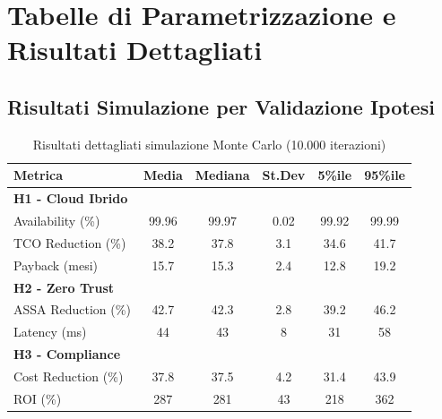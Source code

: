 \chapter{Tabelle di Parametrizzazione e Risultati Dettagliati}

\section{Risultati Simulazione per Validazione Ipotesi}

\begin{table}[H]
\centering
\begin{tabular}{lccccc}
\toprule
\textbf{Metrica} & \textbf{Media} & \textbf{Mediana} & \textbf{St.Dev} & \textbf{5\%ile} & \textbf{95\%ile} \\
\midrule
\multicolumn{6}{l}{\textbf{H1 - Cloud Ibrido}} \\
Availability (\%) & 99.96 & 99.97 & 0.02 & 99.92 & 99.99 \\
TCO Reduction (\%) & 38.2 & 37.8 & 3.1 & 34.6 & 41.7 \\
Payback (mesi) & 15.7 & 15.3 & 2.4 & 12.8 & 19.2 \\
\midrule
\multicolumn{6}{l}{\textbf{H2 - Zero Trust}} \\
ASSA Reduction (\%) & 42.7 & 42.3 & 2.8 & 39.2 & 46.2 \\
Latency (ms) & 44 & 43 & 8 & 31 & 58 \\
\midrule
\multicolumn{6}{l}{\textbf{H3 - Compliance}} \\
Cost Reduction (\%) & 37.8 & 37.5 & 4.2 & 31.4 & 43.9 \\
ROI (\%) & 287 & 281 & 43 & 218 & 362 \\
\bottomrule
\end{tabular}
\caption{Risultati dettagliati simulazione Monte Carlo (10.000 iterazioni)}
\end{table}
